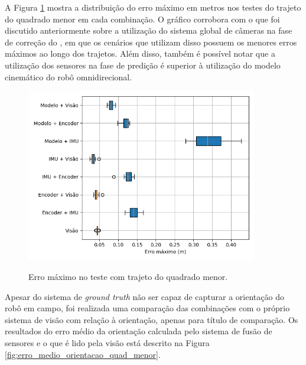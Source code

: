 \documentclass[acronym, symbols, table]{fei}
\begin{document}
	A Figura \ref{fig:erro_maximo_distancia_quad_menor} mostra a distribuição do erro máximo em metros nos testes do trajeto do quadrado menor em cada combinação. O gráfico corrobora com o que foi discutido anteriormente sobre a utilização do sistema global de câmeras na fase de correção do , em que os cenários que utilizam disso possuem os menores erros máximos ao longo dos trajetos. Além disso, também é possível notar que a utilização dos sensores na fase de predição é superior à utilização do modelo cinemático do robô omnidirecional.
	
	\begin{figure}[!htb]
		\centering
		\caption{Erro máximo no teste com trajeto do quadrado menor.}
		\includegraphics[width=0.9\textwidth]{../Dados/Graficos-Resultados/erro_maximo_distancia_quadrado_menor.png}
		\label{fig:erro_maximo_distancia_quad_menor}
	\end{figure}

	Apesar do sistema de \textit{ground truth} não ser capaz de capturar a orientação do robô em campo, foi realizada uma comparação das combinações com o próprio sistema de visão com relação à orientação, apenas para título de comparação. Os resultados do erro médio da orientação calculada pelo sistema de fusão de sensores e o que é lido pela visão está descrito na Figura \ref{fig:erro_medio_orientacao_quad_menor}. 
\end{document}
